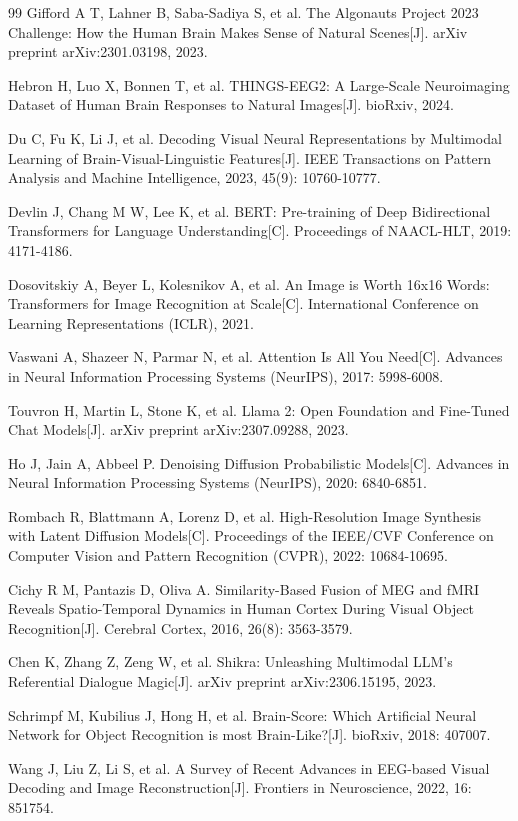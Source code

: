 \begin{thebibliography}{99}
 Gifford A T, Lahner B, Saba-Sadiya S, et al. The Algonauts Project 2023 Challenge: How the Human Brain Makes Sense of Natural Scenes[J]. arXiv preprint arXiv:2301.03198, 2023.

 Hebron H, Luo X, Bonnen T, et al. THINGS-EEG2: A Large-Scale Neuroimaging Dataset of Human Brain Responses to Natural Images[J]. bioRxiv, 2024.

 Du C, Fu K, Li J, et al. Decoding Visual Neural Representations by Multimodal Learning of Brain-Visual-Linguistic Features[J]. IEEE Transactions on Pattern Analysis and Machine Intelligence, 2023, 45(9): 10760-10777.

 Devlin J, Chang M W, Lee K, et al. BERT: Pre-training of Deep Bidirectional Transformers for Language Understanding[C]. Proceedings of NAACL-HLT, 2019: 4171-4186.

 Dosovitskiy A, Beyer L, Kolesnikov A, et al. An Image is Worth 16x16 Words: Transformers for Image Recognition at Scale[C]. International Conference on Learning Representations (ICLR), 2021.

 Vaswani A, Shazeer N, Parmar N, et al. Attention Is All You Need[C]. Advances in Neural Information Processing Systems (NeurIPS), 2017: 5998-6008.

 Touvron H, Martin L, Stone K, et al. Llama 2: Open Foundation and Fine-Tuned Chat Models[J]. arXiv preprint arXiv:2307.09288, 2023.

 Ho J, Jain A, Abbeel P. Denoising Diffusion Probabilistic Models[C]. Advances in Neural Information Processing Systems (NeurIPS), 2020: 6840-6851.

 Rombach R, Blattmann A, Lorenz D, et al. High-Resolution Image Synthesis with Latent Diffusion Models[C]. Proceedings of the IEEE/CVF Conference on Computer Vision and Pattern Recognition (CVPR), 2022: 10684-10695.

 Cichy R M, Pantazis D, Oliva A. Similarity-Based Fusion of MEG and fMRI Reveals Spatio-Temporal Dynamics in Human Cortex During Visual Object Recognition[J]. Cerebral Cortex, 2016, 26(8): 3563-3579.

 Chen K, Zhang Z, Zeng W, et al. Shikra: Unleashing Multimodal LLM's Referential Dialogue Magic[J]. arXiv preprint arXiv:2306.15195, 2023.

 Schrimpf M, Kubilius J, Hong H, et al. Brain-Score: Which Artificial Neural Network for Object Recognition is most Brain-Like?[J]. bioRxiv, 2018: 407007.

 Wang J, Liu Z, Li S, et al. A Survey of Recent Advances in EEG-based Visual Decoding and Image Reconstruction[J]. Frontiers in Neuroscience, 2022, 16: 851754.

\end{thebibliography}
